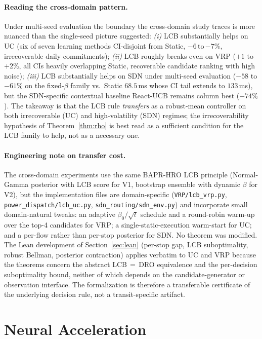 \documentclass[11pt]{article}
\theoremstyle{definition}
\theoremstyle{remark}
\begin{document}
\paragraph{Reading the cross-domain pattern.}
Under multi-seed evaluation the boundary the cross-domain study
traces is more nuanced than the single-seed picture suggested:
\emph{(i)} LCB substantially helps on UC (six of seven learning
methods CI-disjoint from Static, $-6$\,to\,$-7\%$, irrecoverable
daily commitments); \emph{(ii)} LCB roughly breaks even on VRP
($+1$ to $+2\%$, all CIs heavily overlapping Static, recoverable
candidate ranking with high noise); \emph{(iii)} LCB substantially
helps on SDN under multi-seed evaluation ($-58$ to $-61\%$ on the
fixed-$\beta$ family vs.\ Static $68.5$\,ms whose CI tail extends
to $133$\,ms), but the SDN-specific contextual baseline React-UCB
remains column best ($-74\%$). The takeaway is that the LCB rule
\emph{transfers} as a robust-mean controller on both irrecoverable
(UC) and high-volatility (SDN) regimes; the irrecoverability
hypothesis of Theorem~\ref{thm:rho} is best read as a sufficient
condition for the LCB family to help, not as a necessary one.

\paragraph{Engineering note on transfer cost.}
The cross-domain experiments use the same BAPR-HRO LCB principle
(Normal-Gamma posterior with LCB score for V1, bootstrap ensemble
with dynamic $\beta$ for V2), but the implementation files are
domain-specific (\texttt{VRP/lcb\_vrp.py},
\texttt{power\_dispatch/lcb\_uc.py},
\texttt{sdn\_routing/sdn\_env.py}) and incorporate small
domain-natural tweaks: an adaptive $\beta_0/\sqrt{t}$ schedule and a
round-robin warm-up over the top-4 candidates for VRP; a
single-static-execution warm-start for UC; and a per-flow rather
than per-stop posterior for SDN. No theorem was modified. The Lean
development of Section~\ref{sec:lean} (per-stop gap, LCB
suboptimality, robust Bellman, posterior contraction) applies
verbatim to UC and VRP because the theorems concern the abstract
LCB$\,=\,$DRO equivalence and the per-decision suboptimality bound,
neither of which depends on the candidate-generator or observation
interface. The formalization is therefore a transferable certificate
of the underlying decision rule, not a transit-specific artifact.

\section{Neural Acceleration}
\label{sec:neural}
\end{document}

